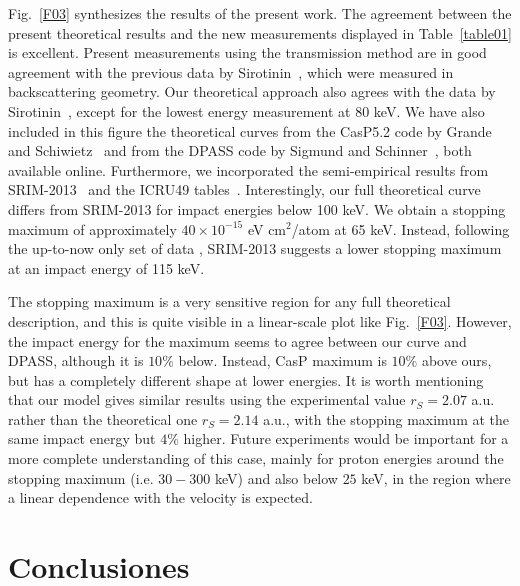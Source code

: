 Fig.~\ref{F03} synthesizes the results of the present work. The 
agreement between the present theoretical results and the new 
measurements displayed in Table~\ref{table01} is excellent. Present 
measurements using the transmission method are in good agreement with 
the previous data by Sirotinin~\cite{Sirotinin}, which were measured 
in backscattering geometry. Our theoretical approach also agrees with 
the data by Sirotinin~\cite{Sirotinin}, except for the lowest energy 
measurement at 80 keV. We have also included in this figure the 
theoretical curves from the CasP5.2 code by Grande and 
Schiwietz~\cite{Grande,casp52} and from the DPASS code by Sigmund and 
Schinner~\cite{DPASS20}, both available online. Furthermore, we 
incorporated the semi-empirical results from SRIM-2013~\cite{Ziegler01} 
and the ICRU49 tables~\cite{ICRU49}. Interestingly, our full theoretical 
curve differs from SRIM-2013 for impact energies below 100 keV. We 
obtain a stopping maximum of approximately 
$40\times 10^{-15}$ eV cm$^2$/atom at 65 keV. Instead, following the 
up-to-now only set of data \cite{Sirotinin}, SRIM-2013 suggests a lower 
stopping maximum at an impact energy of 115 keV. 

The stopping maximum is 
a very sensitive region for any full theoretical description, and this is quite visible in a linear-scale plot like 
Fig.~\ref{F03}. However, the impact energy for the maximum seems to 
agree between our curve and DPASS, although it is $10 \%$ below. 
Instead, CasP maximum is $10 \%$ above ours, but 
has a completely different shape at lower energies. It is worth 
mentioning that our model gives similar results using the experimental 
value $r_S=2.07$ a.u. rather than the theoretical one $r_S=2.14$ a.u.,
with the stopping maximum at the same impact energy but $4\%$ higher. Future experiments would be important for a more complete understanding of this case, mainly for proton energies around the stopping maximum (i.e. $30-300$ keV) and also below $25$ keV, in the region where a linear dependence with the velocity is expected.


\section{Conclusiones}
\label{sec:stopping-conclusiones}

